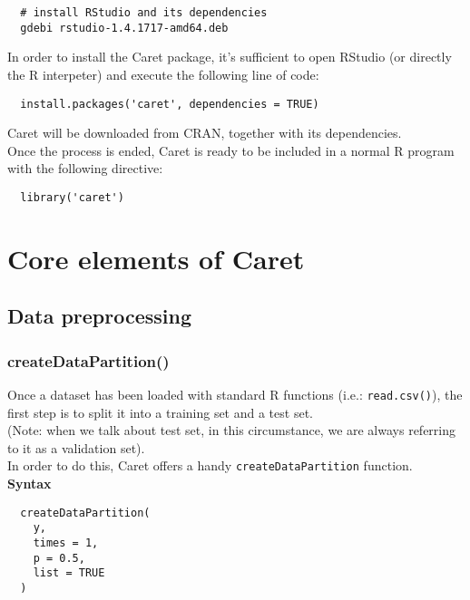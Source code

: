 \documentclass{article}
\begin{document}
\begin{lstlisting}
  # install RStudio and its dependencies
  gdebi rstudio-1.4.1717-amd64.deb
\end{lstlisting}

\pagebreak

In order to install the Caret package, it's sufficient to open RStudio (or directly the R interpeter) and execute the following line of code:\\

\begin{lstlisting}
  install.packages('caret', dependencies = TRUE)
\end{lstlisting}

Caret will be downloaded from CRAN, together with its dependencies.\\

Once the process is ended, Caret is ready to be included in a normal R program with the following directive:\\

\begin{lstlisting}
  library('caret')
\end{lstlisting}

\section{Core elements of Caret}
\subsection{Data preprocessing}
\subsubsection{createDataPartition()}
Once a dataset has been loaded with standard R functions (i.e.: \texttt{read.csv()}), the first step is to split it into a training set and a test set.\\
(Note: when we talk about test set, in this circumstance, we are always referring to it as a validation set).\\

In order to do this, Caret offers a handy \texttt{createDataPartition} function.\\

\textbf{Syntax}
\begin{verbatim}
  createDataPartition(
    y,
    times = 1,
    p = 0.5,
    list = TRUE
  )

\end{verbatim}
\end{document}
